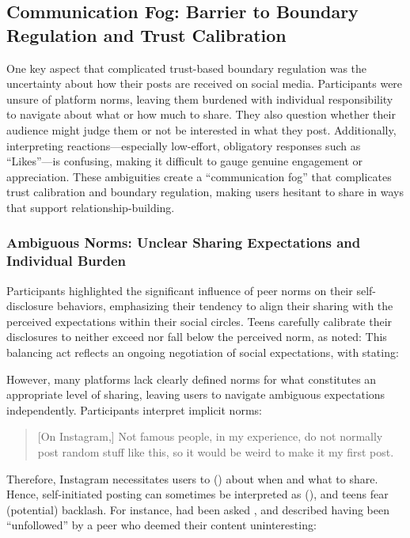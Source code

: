 \subsection{Communication Fog: Barrier to Boundary Regulation and Trust Calibration}
\label{section:4-2}
One key aspect that complicated trust-based boundary regulation was the uncertainty about how their posts are received on social media. Participants were unsure of platform norms, leaving them burdened with individual responsibility to navigate about what or how much to share. They also question whether their audience might judge them or not be interested in what they post. Additionally, interpreting reactions---especially low-effort, obligatory responses such as ``Likes''---is confusing, making it difficult to gauge genuine engagement or appreciation. These ambiguities create a ``communication fog'' that complicates trust calibration and boundary regulation, making users hesitant to share in ways that support relationship-building.


\subsubsection{Ambiguous Norms: Unclear Sharing Expectations and Individual Burden}
\label{section:4-2-1}
Participants highlighted the significant influence of peer norms on their self-disclosure behaviors, emphasizing their tendency to align their sharing with the perceived expectations within their social circles. Teens carefully calibrate their disclosures to neither exceed nor fall below the perceived norm, as  noted:  This balancing act reflects an ongoing negotiation of social expectations, with  stating:  

However, many platforms lack clearly defined norms for what constitutes an appropriate level of sharing, leaving users to navigate ambiguous expectations independently. Participants interpret implicit norms:
\blockquote{[On Instagram,] Not famous people, in my experience, do not normally post random stuff like this, so it would be weird to make it my first post.}{}
Therefore, Instagram necessitates users to  () about when and what to share. Hence, self-initiated posting can sometimes be interpreted as  (), and teens fear (potential) backlash. For instance,  had been asked , and  described having been ``unfollowed'' by a peer who deemed their content uninteresting: 

